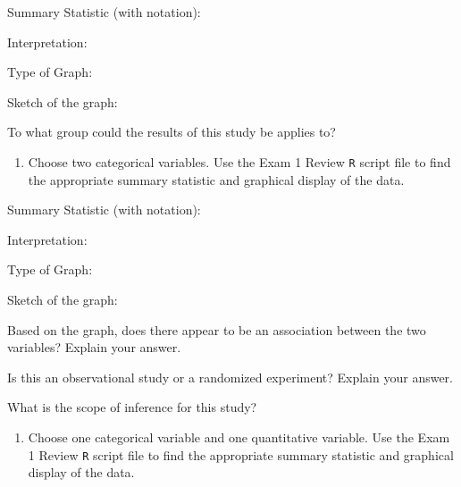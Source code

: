 \documentclass[
]{report}
\providecommand{\tightlist}{%
  \setlength{\itemsep}{0pt}\setlength{\parskip}{0pt}}
\newcommand{\rgi}{\hspace{24pt}}  %
\begin{document}
\rgi Summary Statistic (with notation):

\rgi \rgi Interpretation:

\vspace{0.3in}

\rgi Type of Graph:

\vspace{0.3in}

\rgi Sketch of the graph:

\vspace{1.5in}

\rgi To what group could the results of this study be applies to?

\vspace{0.3in}

\begin{enumerate}
\def\labelenumi{\arabic{enumi}.}
\setcounter{enumi}{5}
\tightlist
\item
  Choose two categorical variables. Use the Exam 1 Review \texttt{R} script file to find the appropriate summary statistic and graphical display of the data.
\end{enumerate}

\rgi Summary Statistic (with notation):

\rgi \rgi Interpretation:

\vspace{0.3in}

\rgi Type of Graph:

\vspace{0.3in}

\rgi Sketch of the graph:

\vspace{1.5in}

\rgi \rgi Based on the graph, does there appear to be an association between the two variables? Explain your answer.

\vspace{0.5in}

\rgi Is this an observational study or a randomized experiment? Explain your answer.

\vspace{0.5in}

\rgi What is the scope of inference for this study?

\vspace{0.3in}

\begin{enumerate}
\def\labelenumi{\arabic{enumi}.}
\setcounter{enumi}{6}
\tightlist
\item
  Choose one categorical variable and one quantitative variable. Use the Exam 1 Review \texttt{R} script file to find the appropriate summary statistic and graphical display of the data.
\end{enumerate}
\end{document}
